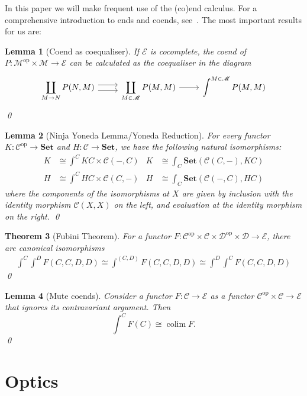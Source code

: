 \documentclass[11pt,letterpaper]{article}
\theoremstyle{plain}
\newtheorem{theorem}{Theorem}[subsection]
\newtheorem{lemma}[theorem]{Lemma}
\theoremstyle{definition}
\newcommand{\C}{\mathscr{C}}
\newcommand{\D}{\mathscr{D}}
\newcommand{\E}{\mathscr{E}}
\newcommand{\M}{\mathscr{M}}
\newcommand{\Set}{\mathbf{Set}}
\newcommand{\op}{\mathrm{op}}
\DeclareMathOperator*{\colim}{\mathrm{colim}}
\begin{document}
In this paper we will make frequent use of the (co)end calculus. For a comprehensive introduction to ends and coends, see~\cite{CoendCofriend}. The most important results for us are:

\begin{lemma}[Coend as coequaliser]\label{lemma:calculate-coend}
If $\E$ is cocomplete, the coend of $P : \M^\op \times \M \to \E$ can be calculated as the coequaliser in the diagram
\[
  \begin{tikzcd}
    \displaystyle \coprod_{M \to N} P(N, M) \ar[r,shift left=.75ex]  \ar[r,shift right=.75ex] & \displaystyle\coprod_{M \in \M} P(M, M) \ar[r] & \displaystyle\int^{M \in \M} P(M, M)
  \end{tikzcd}
\]
\qed
\end{lemma}

\begin{lemma}[Ninja Yoneda Lemma/Yoneda Reduction]
For every functor $K : \C^\op \to \Set$ and $H : \C \to \Set$, we have the following natural isomorphisms:
\begin{align*}
K &\cong \int^C KC \times \C(-,C) &
K &\cong \int_C \Set(\C(C,-), KC) \\
H &\cong \int^C HC \times \C(C,-)  &
H &\cong \int_C \Set(\C(-,C), HC)
\end{align*}
where the components of the isomorphisms at $X$ are given by inclusion with the identity morphism $\C(X, X)$ on the left, and evaluation at the identity morphism on the right.
\qed
\end{lemma}

\begin{theorem}[Fubini Theorem]
For a functor $F : \C^\op \times \C \times \D^\op \times \D \to \E$, there are canonical isomorphisms
\begin{align*}
\int^C \int^D F(C,C,D,D) \cong \int^{(C,D)} F(C,C,D,D) \cong \int^D \int^C F(C,C,D,D)
\end{align*}
\qed
\end{theorem}

\begin{lemma}[Mute coends]
Consider a functor $F : \C \to \E$ as a functor $\C^\op \times \C \to \E$ that ignores its contravariant argument. Then \[ \int^C F(C) \cong  \colim F. \] \qed
\end{lemma}

\section{Optics}\label{sec:optics}
\end{document}
